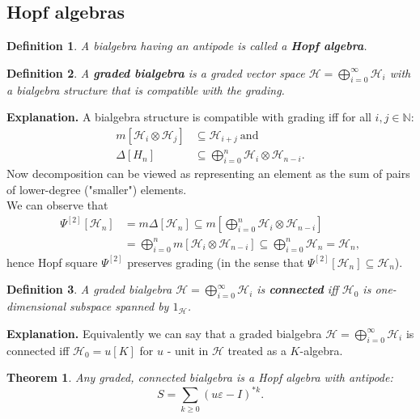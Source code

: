 \documentclass[a4paper, 12pt]{article}
\newtheorem{definition}{Definition}
\newtheorem{theorem}{Theorem}
\begin{document}
\subsection{Hopf algebras}
\begin{definition}
A bialgebra having an antipode is called a \textbf{Hopf algebra}.
\end{definition}
\begin{definition}\label{bialgebras}
A \textbf{graded bialgebra} is a graded vector space
$\mathcal{H} = \displaystyle\bigoplus^{\infty}_{i=0}\mathcal{H}_i$ with a bialgebra structure that is
compatible with the grading.
\end{definition}
\textbf{Explanation. } A bialgebra structure is compatible with grading iff for all $i, j \in \mathbb{N}$:
\begin{align*}
m[\mathcal{H}_i \otimes \mathcal{H}_j] &\subseteq \mathcal{H}_{i+j} \mathrm{\ and} \\
\Delta[H_n] &\subseteq \bigoplus^{n}_{i = 0} \mathcal{H}_i \otimes \mathcal{H}_{n-i}.
\end{align*}
\indent Now decomposition can be viewed as representing an element as the sum of pairs of lower-degree
("smaller") elements. \\
\indent We can observe that
\begin{align*}
\Psi^{[2]}[\mathcal{H}_n] &= m\Delta[\mathcal{H}_n] \subseteq m[\bigoplus^n_{i = 0} \mathcal{H}_i \otimes
\mathcal{H}_{n - i}] \\ &= \bigoplus^n_{i = 0} m[\mathcal{H}_i \otimes \mathcal{H}_{n - i}] \subseteq
\bigoplus^n_{i = 0} \mathcal{H}_n = \mathcal{H}_n,
\end{align*}
hence Hopf square $\Psi^{[2]}$ preserves grading
(in the sense that $\Psi^{[2]}[\mathcal{H}_n] \subseteq \mathcal{H}_n$).
\begin{definition}
A graded bialgebra $\mathcal{H} = \displaystyle\bigoplus^{\infty}_{i=0}\mathcal{H}_i$ is
\textbf{connected} iff $\mathcal{H}_0$ is one-dimensional subspace spanned by $1_\mathcal{H}$.
\end{definition}
\noindent \textbf{Explanation. } Equivalently we can say that a graded bialgebra
$\mathcal{H} = \displaystyle\bigoplus^{\infty}_{i=0}\mathcal{H}_i$ is
connected iff $\mathcal{H}_0 = u[K]$ for $u$ - unit in $\mathcal{H}$ treated as a $K$-algebra.
\begin{theorem}
Any graded, connected bialgebra is a Hopf algebra with antipode:
\begin{equation*}
S = \sum_{k \geq 0} (u\varepsilon - I)^{*k}.
\end{equation*}
\end{theorem}
\end{document}
